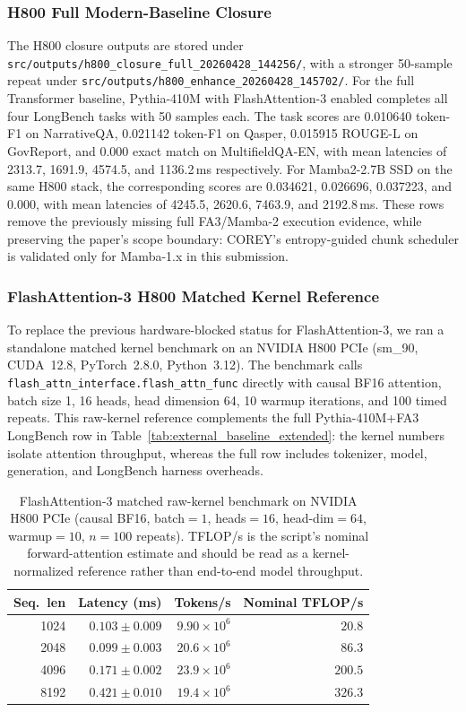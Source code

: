 \subsubsection{H800 Full Modern-Baseline Closure}
\label{sec:h800_full_baselines}

The H800 closure outputs are stored under
\texttt{src/outputs/h800\_closure\_full\_20260428\_144256/}, with a stronger
50-sample repeat under \texttt{src/outputs/h800\_enhance\_20260428\_145702/}.
For the full Transformer baseline, Pythia-410M with FlashAttention-3 enabled
completes all four LongBench tasks with 50 samples each.  The task scores are
0.010640 token-F1 on NarrativeQA, 0.021142 token-F1 on Qasper, 0.015915
ROUGE-L on GovReport, and 0.000 exact match on MultifieldQA-EN, with mean
latencies of 2313.7, 1691.9, 4574.5, and 1136.2\,ms respectively.  For
Mamba2-2.7B SSD on the same H800 stack, the corresponding scores are 0.034621,
0.026696, 0.037223, and 0.000, with mean latencies of 4245.5, 2620.6, 7463.9,
and 2192.8\,ms.  These rows remove the previously missing full FA3/Mamba-2
execution evidence, while preserving the paper's scope boundary: COREY's
entropy-guided chunk scheduler is validated only for Mamba-1.x in this
submission.

\subsubsection{FlashAttention-3 H800 Matched Kernel Reference}
\label{sec:fa3_h800}

To replace the previous hardware-blocked status for FlashAttention-3, we ran a
standalone matched kernel benchmark on an NVIDIA H800 PCIe (sm\_90, CUDA~12.8,
PyTorch~2.8.0, Python~3.12).  The benchmark calls
\texttt{flash\_attn\_interface.flash\_attn\_func} directly with causal BF16
attention, batch size 1, 16 heads, head dimension 64, 10 warmup iterations, and
100 timed repeats.  This raw-kernel reference complements the full
Pythia-410M+FA3 LongBench row in Table~\ref{tab:external_baseline_extended}:
the kernel numbers isolate attention throughput, whereas the full row includes
tokenizer, model, generation, and LongBench harness overheads.

\begin{table}[!t]
\centering
\caption{FlashAttention-3 matched raw-kernel benchmark on NVIDIA H800 PCIe
(causal BF16, batch$=1$, heads$=16$, head-dim$=64$, warmup$=10$,
$n{=}100$ repeats).  TFLOP/s is the script's nominal forward-attention estimate
and should be read as a kernel-normalized reference rather than end-to-end model
throughput.}
\label{tab:fa3_h800}
\small
\begin{tabular}{rrrr}
\toprule
Seq.\ len & Latency (ms) & Tokens/s & Nominal TFLOP/s \\
\midrule
1024 & $0.103 \pm 0.009$ & $9.90{\times}10^6$ & $20.8$ \\
2048 & $0.099 \pm 0.003$ & $20.6{\times}10^6$ & $86.3$ \\
4096 & $0.171 \pm 0.002$ & $23.9{\times}10^6$ & $200.5$ \\
8192 & $0.421 \pm 0.010$ & $19.4{\times}10^6$ & $326.3$ \\
\bottomrule
\end{tabular}
\end{table}

